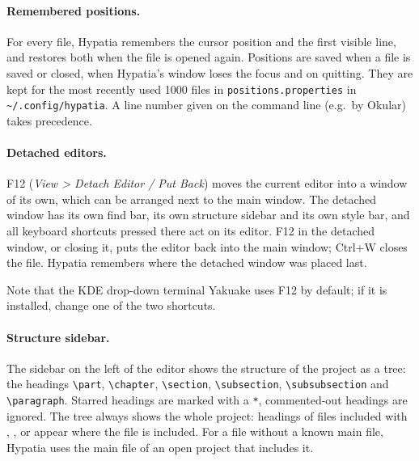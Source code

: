 \documentclass[11pt]{article}
\newcommand{\key}[1]{\textsf{#1}}
\newcommand{\menu}[1]{\textsf{\textit{#1}}}
\newcommand{\file}[1]{\texttt{#1}}
\newcommand{\cfgdir}{\texttt{\textasciitilde/.config/hypatia}}
\begin{document}
    \paragraph{Remembered positions.}     For every file, Hypatia remembers the cursor position and the first visible line, and restores both when the file is opened again. Positions are saved when a file is saved or closed, when Hypatia's window loses the focus and on quitting. They are kept for the most recently used 1000 files in \file{positions.properties} in \cfgdir. A line number given on the command line (e.g.\ by Okular) takes precedence.

    \paragraph{Detached editors.}     \key{F12} (\menu{View > Detach Editor / Put Back}) moves the current editor into a window of its own, which can be arranged next to the main window. The detached window has its own find bar, its own structure sidebar and its own style bar, and all keyboard shortcuts pressed there act on its editor. \key{F12} in the detached window, or closing it, puts the editor back into the main window; \key{Ctrl+W} closes the file. Hypatia remembers where the detached window was placed last.

    Note that the KDE drop-down terminal Yakuake uses \key{F12} by default; if it is installed, change one of the two shortcuts.

    \paragraph{Structure sidebar.}     The sidebar on the left of the editor shows the structure of the project as a tree: the headings \verb+\part+, \verb+\chapter+, \verb+\section+, \verb+\subsection+, \verb+\subsubsection+ and \verb+\paragraph+. Starred headings are marked with a \verb+*+, commented-out headings are ignored. The tree always shows the whole project: headings of files included with \verb++, \verb++, \verb++ or \verb++ appear where the file is included. For a file without a known main file, Hypatia uses the main file of an open project that includes it.
\end{document}
